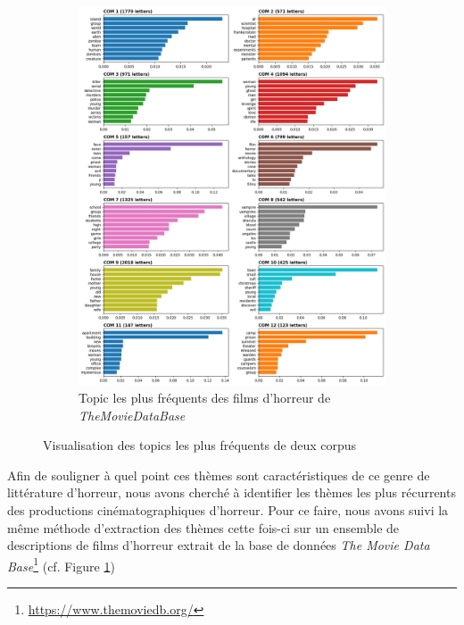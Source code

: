 \documentclass[12pt,a4paper,oneside,titlepage]{book} %
\begin{document}
\begin{figure}[htbp]
\begin{subfigure}{0.45\textwidth}
		\includegraphics[width=\textwidth]{illustration/tf_idf_topic_tmdb.png}
		\caption{Topic les plus fréquents des films d'horreur de \emph{TheMovieDataBase}}
		\label{fig:topic_tmdb}
	\end{subfigure}
	\caption{Visualisation des topics les plus fréquents de deux corpus}
	\label{fig:topics_corpus}
	\end{figure}
	
	Afin de souligner à quel point ces thèmes sont caractéristiques de ce genre de littérature d'horreur, nous avons cherché à identifier les thèmes les plus récurrents des productions cinématographiques d'horreur.
	Pour ce faire, nous avons suivi la même méthode d'extraction des thèmes cette fois-ci sur un ensemble de descriptions de films d'horreur extrait de la base de données \textit{The Movie Data Base}\footnote{\url{https://www.themoviedb.org/}} (cf. Figure \ref{fig:topic_tmdb})	
	
\end{document}
